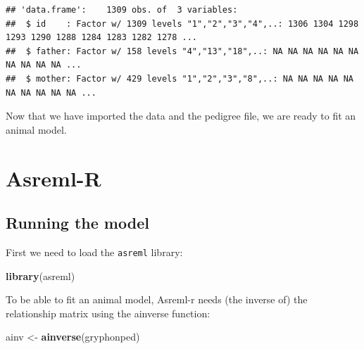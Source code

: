 \documentclass[
  12pt,
]{book}
\newenvironment{Shaded}{\begin{snugshade}}{\end{snugshade}}
\newcommand{\KeywordTok}[1]{\textcolor[rgb]{0.13,0.29,0.53}{\textbf{#1}}}
\newcommand{\NormalTok}[1]{#1}
\newcommand{\OperatorTok}[1]{\textcolor[rgb]{0.81,0.36,0.00}{\textbf{#1}}}
\newcommand{\StringTok}[1]{\textcolor[rgb]{0.31,0.60,0.02}{#1}}
\begin{document}
\begin{Shaded}
\end{Shaded}

\begin{verbatim}
## 'data.frame':    1309 obs. of  3 variables:
##  $ id    : Factor w/ 1309 levels "1","2","3","4",..: 1306 1304 1298 1293 1290 1288 1284 1283 1282 1278 ...
##  $ father: Factor w/ 158 levels "4","13","18",..: NA NA NA NA NA NA NA NA NA NA ...
##  $ mother: Factor w/ 429 levels "1","2","3","8",..: NA NA NA NA NA NA NA NA NA NA ...
\end{verbatim}

Now that we have imported the data and the pedigree file, we are ready to fit an animal model.

\hypertarget{asreml-r-1}{%
\section{Asreml-R}\label{asreml-r-1}}

\hypertarget{running-the-model}{%
\subsection{Running the model}\label{running-the-model}}

First we need to load the \texttt{asreml} library:

\begin{Shaded}
\begin{Highlighting}[]
\KeywordTok{library}\NormalTok{(asreml)}
\end{Highlighting}
\end{Shaded}

To be able to fit an animal model, Asreml-r needs (the inverse of) the relationship matrix using the ainverse function:

\begin{Shaded}
\begin{Highlighting}[]
\NormalTok{ainv \textless{}{-}}\StringTok{ }\KeywordTok{ainverse}\NormalTok{(gryphonped)}
\end{Highlighting}
\end{Shaded}
\end{document}

